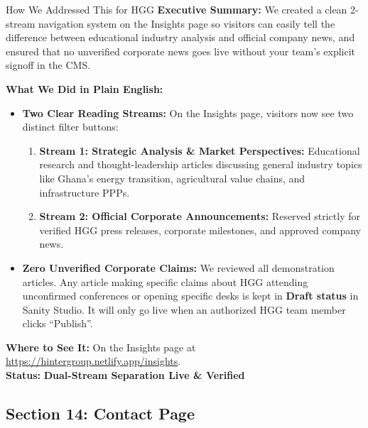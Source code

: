 \documentclass[11pt,a4paper]{article}
\begin{document}
\begin{DetailedResolutionBox}{How We Addressed This for HGG}
\textbf{Executive Summary:} We created a clean 2-stream navigation system on the Insights page so visitors can easily tell the difference between educational industry analysis and official company news, and ensured that no unverified corporate news goes live without your team's explicit signoff in the CMS.

\textbf{What We Did in Plain English:}
\begin{itemize}
    \item \textbf{Two Clear Reading Streams:} On the Insights page, visitors now see two distinct filter buttons:
    \begin{enumerate}[noitemsep]
        \item \textbf{Stream 1: Strategic Analysis \& Market Perspectives:} Educational research and thought-leadership articles discussing general industry topics like Ghana's energy transition, agricultural value chains, and infrastructure PPPs.
        \item \textbf{Stream 2: Official Corporate Announcements:} Reserved strictly for verified HGG press releases, corporate milestones, and approved company news.
    \end{enumerate}
    \item \textbf{Zero Unverified Corporate Claims:} We reviewed all demonstration articles. Any article making specific claims about HGG attending unconfirmed conferences or opening specific desks is kept in \textbf{Draft status} in Sanity Studio. It will only go live when an authorized HGG team member clicks ``Publish''.
\end{itemize}

\textbf{Where to See It:} On the Insights page at \url{https://hintergroup.netlify.app/insights}. \\
\textbf{Status:} \textcolor{HGGGreen}{\textbf{Dual-Stream Separation Live \& Verified}}
\end{DetailedResolutionBox}

\vspace{0.3cm}

\subsection{Section 14: Contact Page}
\end{document}
